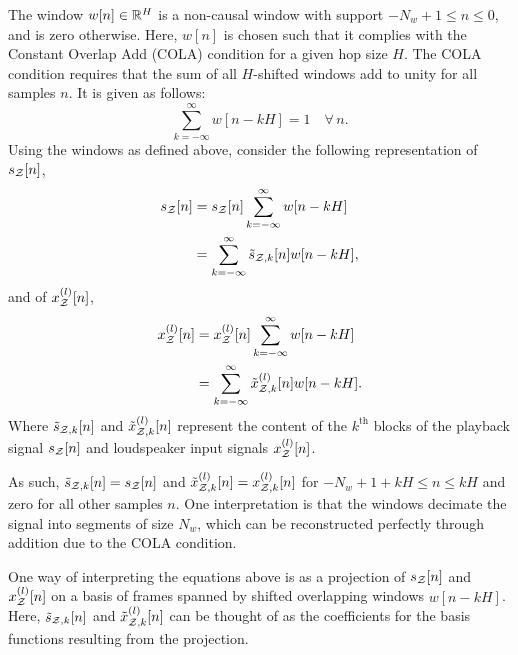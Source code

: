 The window $w[n]\in\mathbb{R}^{H}$ is a non-causal window with support $-N_w + 1 \leq n \leq 0$, and is zero otherwise. 
Here, $w[n]$ is chosen such that it complies with the Constant Overlap Add (COLA) condition for a given hop size $H$.
The COLA condition requires that the sum of all $H$-shifted windows add to unity for all samples $n$. 
It is given as follows:
\begin{equation}
     \sum_{k=-\infty}^{\infty} w[n - kH] = 1 \quad\forall\,n.
\end{equation}
Using the windows as defined above, consider the following representation of $s_{\mathcal{Z}}[n]$,
\begin{equation}
    \begin{aligned}
        s_{\mathcal{Z}}[n] &= s_{\mathcal{Z}}[n]\sum_{k=-\infty}^{\infty} w[n - kH] \\
                 &= \sum_{k=-\infty}^{\infty} \tilde{s}_{\mathcal{Z},k}[n]w[n - kH],
    \end{aligned}
    \label{eq:perceptual_sound_zones:stft:block_based:desired_playback}
\end{equation}
and of $x^{(l)}_{\mathcal{Z}}[n]$,
\begin{equation}
    \begin{aligned}
        x^{(l)}_{\mathcal{Z}}[n] &= x^{(l)}_{\mathcal{Z}}[n]\sum_{k=-\infty}^{\infty} w[n - kH] \\
                       &= \sum_{k=-\infty}^{\infty} \tilde{x}^{(l)}_{\mathcal{Z},k}[n]w[n - kH].
    \end{aligned}
    \label{eq:perceptual_sound_zones:stft:block_based:loudspeaker_inputs}
\end{equation}
Where $\tilde{s}_{\mathcal{Z},k}[n]$ and $\tilde{x}^{(l)}_{\mathcal{Z},k}[n]$ represent the content of the $k^\text{th}$ blocks of the playback signal $s_{\mathcal{Z}}[n]$ and loudspeaker input signals $x^{(l)}_{\mathcal{Z}}[n]$.

As such, $\tilde{s}_{\mathcal{Z},k}[n] = s_{\mathcal{Z}}[n]$ and $\tilde{x}^{(l)}_{\mathcal{Z},k}[n] = x^{(l)}_{\mathcal{Z},k}[n]$ for $-N_w + 1 + kH \leq n \leq kH$ and zero for all other samples $n$.  
One interpretation is that the windows decimate the signal into segments of size $N_w$, which can be reconstructed perfectly through addition due to the COLA condition.

One way of interpreting the equations above is as a projection of $s_{\mathcal{Z}}[n]$ and $x^{(l)}_{\mathcal{Z}}[n]$ on a basis of frames spanned by shifted overlapping windows $w[n - kH]$.
Here, $\tilde{s}_{\mathcal{Z},k}[n]$ and $\tilde{x}^{(l)}_{\mathcal{Z},k}[n]$ can be thought of as the coefficients for the basis functions resulting from the projection.

